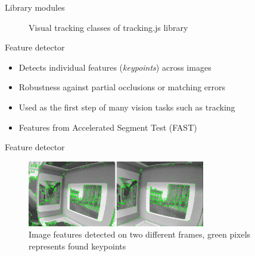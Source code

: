 \documentclass{beamer}
\begin{document}
\begin{frame}{Library modules}
  \begin{figure}[!htb]
      \caption{Visual tracking classes of tracking.js library}
      \label{figure:visual_tracking_classes}
  \end{figure}
\end{frame}
\begin{frame}{Feature detector}
  \begin{itemize}
    \item Detects individual features (\textit{keypoints}) across images
    \item Robustness against partial occlusions or matching errors
    \item Used as the first step of many vision tasks such as tracking
    \item Features from Accelerated Segment Test (FAST)
  \end{itemize}
\end{frame}
\begin{frame}{Feature detector}
  \begin{figure}[!htb]
    \centering
    \includegraphics[width=220pt]{../chapters/tracking_library_for_the_web/keypoints.png}
    \caption{Image features detected on two different frames, green pixels represents found keypoints}
    \label{figure:keypoints}
  \end{figure}
\end{frame}
\end{document}
